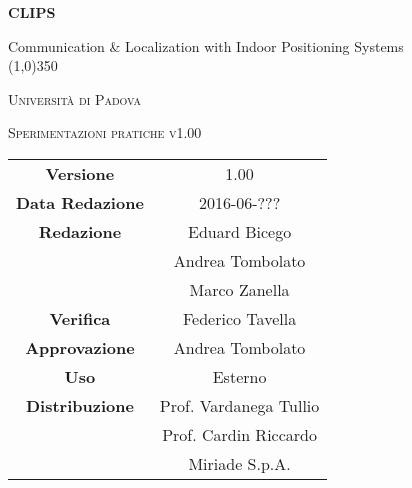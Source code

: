 \documentclass[a4paper,12pt]{article}
\author{}
\date{9/12/2015}
\begin{document}
	\begin{titlepage}
		\centering
		{\huge\bfseries CLIPS\par}
	Communication \& Localization with Indoor Positioning Systems \\
	\line(1,0){350} \\
	{\scshape\LARGE Università di Padova \par}
	\vspace{1cm}
	{\scshape\Large Sperimentazioni pratiche v1.00\par}
	\logo
	\newpage
		\begin{tabular}{c|c}
			{\hfill \textbf{Versione}} 		& 1.00				\\
			{\hfill\textbf{Data Redazione}} 	& 2016-06-???	  		\\
			{\hfill\textbf{Redazione}}		& Eduard Bicego \\
											& Andrea Tombolato  \\
											& Marco Zanella		\\
			{\hfill\textbf{Verifica}} 		& Federico Tavella		\\
			{\hfill\textbf{Approvazione}} 		& Andrea Tombolato		\\
			{\hfill\textbf{Uso}} 			& Esterno			\\
			{\hfill\textbf{Distribuzione}} 		& Prof. Vardanega Tullio 	\\
								& Prof. Cardin Riccardo 	\\
								& Miriade S.p.A. 		\\
		\end{tabular}
	\end{titlepage}
	\newpage
		\pagestyle{myfront}
		

	\newpage
		\tableofcontents
	\newpage
		\listoftables
	\newpage
		\listoffigures
	\label{LastFrontPage}

	\newpage
	\pagestyle{mymain}
				
		
	\newpage
		
		
	\newpage
		
		
	\newpage
				
		
	\newpage
		
		
	
	\newpage
		
		
	\newpage
		
		
	\label{LastPage}
\end{document}
